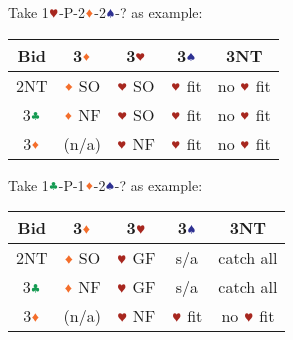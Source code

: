 \documentclass{article}
\begin{document}
\begin{multicols}{2}
\noindent Take 1$\hhh$-P-2$\ddd$-2$\sss$-? as example: \\
\begin{tabular}{c|c|c|c|c}
    \hline
    Bid & 3$\ddd$ & 3$\hhh$ & 3$\sss$ & 3NT \\ \hline\hline
    2NT & $\ddd$ SO & $\hhh$ SO & $\hhh$ fit & no $\hhh$ fit \\ \hline
    3$\ccc$ & $\ddd$ NF & $\hhh$ SO & $\hhh$ fit & no $\hhh$ fit \\ \hline
    3$\ddd$ & (n/a) & $\hhh$ NF & $\hhh$ fit & no $\hhh$ fit \\ \hline
\end{tabular}

\noindent Take 1$\ccc$-P-1$\ddd$-2$\sss$-? as example: \\
\begin{tabular}{c|c|c|c|c}
    \hline
    Bid & 3$\ddd$ & 3$\hhh$ & 3$\sss$ & 3NT \\ \hline\hline
    2NT & $\ddd$ SO & $\hhh$ GF & s/a & catch all \\ \hline
    3$\ccc$ & $\ddd$ NF & $\hhh$ GF & s/a & catch all \\ \hline
    3$\ddd$ & (n/a) & $\hhh$ NF & $\hhh$ fit & no $\hhh$ fit \\ \hline
\end{tabular}


\end{multicols}
\end{document}

